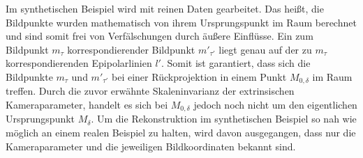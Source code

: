 %
% 
%
%
%
%

Im synthetischen Beispiel wird mit reinen Daten gearbeitet. Das heißt, die Bildpunkte wurden mathematisch von ihrem Ursprungspunkt im Raum berechnet und sind somit frei von Verfälschungen durch äußere Einflüsse. Ein zum Bildpunkt $m_\tau$ korrespondierender Bildpunkt $m'_{\tau'}$ liegt genau auf der zu $m_\tau$ korrespondierenden Epipolarlinien $l'$. Somit ist garantiert, dass sich die Bildpunkte $m_\tau$ und $m'_{\tau'}$ bei einer Rückprojektion in einem Punkt $M_{0,\delta}$ im Raum treffen. Durch die zuvor erwähnte Skaleninvarianz der extrinsischen Kameraparameter, handelt es sich bei $M_{0,\delta}$ jedoch noch nicht um den eigentlichen Ursprungspunkt $M_\delta$. Um die Rekonstruktion im synthetischen Beispiel so nah wie möglich an einem realen Beispiel zu halten, wird davon ausgegangen, dass nur die Kameraparameter und die jeweiligen Bildkoordinaten bekannt sind.\\


